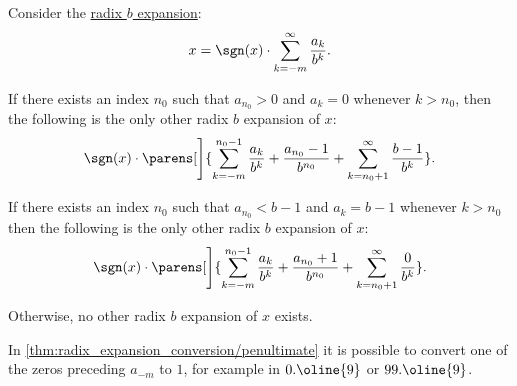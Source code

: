 \begin{proposition}\label{thm:radix_expansion_conversion}
  Consider the \hyperref[def:real_number_radix_expansion]{radix \( b \) expansion}:
  \begin{equation}\label{eq:thm:radix_expansion_conversion/base}
    x = \sgn(x) \cdot \sum_{k=-m}^\infty \frac {a_k} {b^k}.
  \end{equation}

  \begin{thmenum}
     If there exists an index \( n_0 \) such that \( a_{n_0} > 0 \) and \( a_k = 0 \) whenever \( k > n_0 \), then the following is the only other radix \( b \) expansion of \( x \):
    \begin{equation}\label{eq:thm:radix_expansion_conversion/zeros}
      \sgn(x) \cdot \parens[\Bigg]{ \sum_{k=-m}^{n_0 - 1} \frac {a_k} {b^k} + \frac {a_{n_0} - 1} {b^{n_0}} + \sum_{k=n_0 + 1}^\infty \frac {b - 1} {b^k} }.
    \end{equation}

     If there exists an index \( n_0 \) such that \( a_{n_0} < b - 1 \) and \( a_k = b - 1 \) whenever \( k > n_0 \) then the following is the only other radix \( b \) expansion of \( x \):
    \begin{equation}\label{eq:thm:radix_expansion_conversion/penultimate}
      \sgn(x) \cdot \parens[\Bigg]{ \sum_{k=-m}^{n_0 - 1} \frac {a_k} {b^k} + \frac {a_{n_0} + 1} {b^{n_0}} + \sum_{k=n_0 + 1}^\infty \frac 0 {b^k} }.
    \end{equation}

     Otherwise, no other radix \( b \) expansion of \( x \) exists.
  \end{thmenum}
\end{proposition}
\begin{comments}
  \item In \cref{thm:radix_expansion_conversion/penultimate} it is possible to convert one of the zeros preceding \( a_{-m} \) to \( 1 \), for example in \( 0.\oline{9} \) or \( 99.\oline{9} \).
\end{comments}
